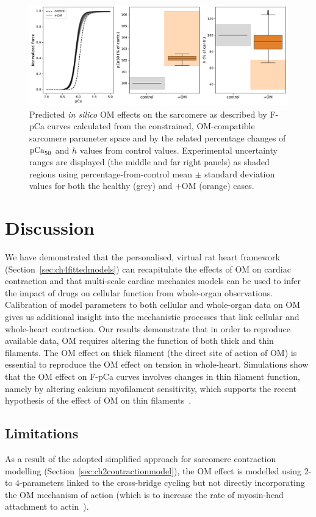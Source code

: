 \begin{figure}[ht!]
    \myfloatalign
    \includegraphics[width=\textwidth]{figures/chapter05/Fig2.pdf}
    \caption{Predicted \textit{in silico} OM effects on the sarcomere as described by F-pCa curves calculated from the constrained, OM-compatible sarcomere parameter space and by the related percentage changes of $\textrm{pCa}_{50}$ and $h$ values from control values. Experimental uncertainty ranges are displayed (the middle and far right panels) as shaded regions using percentage-from-control mean $\pm$ standard deviation values for both the healthy (grey) and $+$OM (orange) cases.}
    \label{fig:wave0mappingtofpCa}
\end{figure}


%
%
%
\section{Discussion}\label{sec:ch5discussion}
We have demonstrated that the personalised, virtual rat heart framework (Section~\ref{sec:ch4fittedmodels}) can recapitulate the effects of OM on cardiac contraction and that multi-scale cardiac mechanics models can be used to infer the impact of drugs on cellular function from whole-organ observations. Calibration of model parameters to both cellular and whole-organ data on OM gives us additional insight into the mechanistic processes that link cellular and whole-heart contraction. Our results demonstrate that in order to reproduce available data, OM requires altering the function of both thick and thin filaments. The OM effect on thick filament (the direct site of action of OM) is essential to reproduce the OM effect on tension in whole-heart. Simulations show that the OM effect on F-pCa curves involves changes in thin filament function, namely by altering calcium myofilament sensitivity, which supports the recent hypothesis of the effect of OM on thin filaments~\cite{Swenson:2017}.


%
%
%
\subsection{Limitations}\label{sec:ch7limitations}
As a result of the adopted simplified approach for sarcomere contraction modelling (Section~\ref{sec:ch2contractionmodel}), the OM effect is modelled using $2$- to $4$-parameters linked to the cross-bridge cycling but not directly incorporating the OM mechanism of action (which is to increase the rate of myosin-head attachment to actin~\cite{Malik:2011}).

